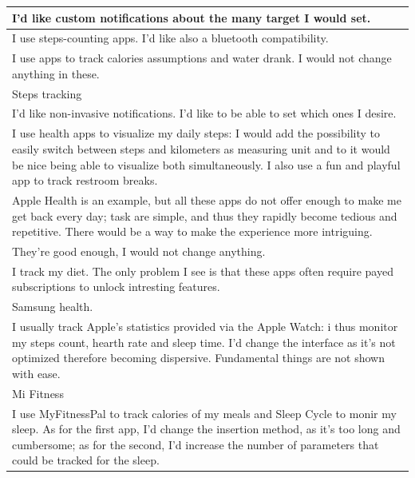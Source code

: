 \documentclass{article}
\begin{document}
\begin{table}[H]
\begin{tabularx}{0.9\textwidth}{X}
        \hline
        I'd like custom notifications about the many target I would set. \\
        \hline
        I use steps-counting apps. I'd like also a bluetooth compatibility. \\
        \hline
        I use apps to track calories assumptions and water drank. I would not change anything in these. \\
        \hline
        Steps tracking \\
        \hline
        I'd like non-invasive notifications. I'd like to be able to set which ones I desire. \\
        \hline
        I use health apps to visualize my daily steps: I would add the possibility to easily switch between steps and kilometers as measuring unit and to it would be nice being able to visualize both simultaneously. I also use a fun and playful app to track restroom breaks. \\
        \hline
        Apple Health is an example, but all these apps do not offer enough to make me get back every day; task are simple, and thus they rapidly become tedious and repetitive. There would be a way to make the experience more intriguing. \\
        \hline
        They're good enough, I would not change anything. \\
        \hline
        I track my diet. The only problem I see is that these apps often require payed subscriptions to unlock intresting features. \\
        \hline
        Samsung health. \\
        \hline
        I usually track Apple's statistics provided via the Apple Watch: i thus monitor my steps count, hearth rate and sleep time. I'd change the interface as it's not optimized therefore becoming dispersive. Fundamental things are not shown with ease. \\
        \hline
        Mi Fitness \\
        \hline
        I use MyFitnessPal to track calories of my meals and Sleep Cycle to monir my sleep. As for the first app, I'd change the insertion method, as it's too long and cumbersome; as for the second, I'd increase the number of parameters that could be tracked for the sleep. \\
        \hline
    \end{tabularx}
\end{table}
\end{document}
